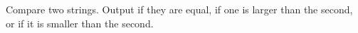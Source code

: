  Compare two strings. 
 Output if they are equal,
 if one is larger than the second,
 or if it is smaller than the second.
